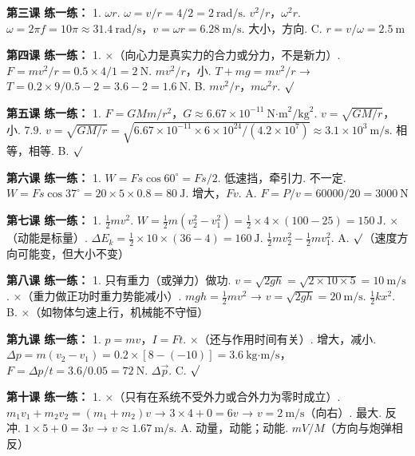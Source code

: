 \documentclass[a4paper,12pt]{ctexart}
\begin{document}
\textbf{第三课 练一练：}
1. $\omega r$. $\omega=v/r=4/2=2\ \text{rad/s}$. $v^2/r$，$\omega^2 r$. $\omega=2\pi f=10\pi\approx31.4\ \text{rad/s}$，$v=\omega r=6.28\ \text{m/s}$. 大小，方向. C. $r=v/\omega=2.5\ \text{m}$

\textbf{第四课 练一练：}
1. ×（向心力是真实力的合力或分力，不是新力）. $F=mv^2/r=0.5\times4/1=2\ \text{N}$. $mv^2/r$，小. $T+mg=mv^2/r$ → $T=0.2\times9/0.5-2=3.6-2=1.6\ \text{N}$. B. $mv^2/r$，$m\omega^2 r$. $\surd$

\textbf{第五课 练一练：}
1. $F=GMm/r^2$，$G\approx6.67\times10^{-11}\ \text{N·m}^2/\text{kg}^2$. $v=\sqrt{GM/r}$，小. $7.9$. $v=\sqrt{GM/r}=\sqrt{6.67\times10^{-11}\times6\times10^{24}/(4.2\times10^7)}\approx3.1\times10^3\ \text{m/s}$. 相等，相等. B. $\surd$

\textbf{第六课 练一练：}
1. $W=Fs\cos60^\circ=Fs/2$. 低速挡，牵引力. 不一定. $W=Fs\cos37^\circ=20\times5\times0.8=80\ \text{J}$. 增大，$Fv$. A. $F=P/v=60000/20=3000\ \text{N}$

\textbf{第七课 练一练：}
1. $\frac{1}{2}mv^2$. $W=\frac{1}{2}m(v_2^2-v_1^2)=\frac{1}{2}\times4\times(100-25)=150\ \text{J}$. ×（动能是标量）. $\Delta E_k=\frac{1}{2}\times10\times(36-4)=160\ \text{J}$. $\frac{1}{2}mv_2^2-\frac{1}{2}mv_1^2$. A. $\surd$（速度方向可能变，但大小不变）

\textbf{第八课 练一练：}
1. 只有重力（或弹力）做功. $v=\sqrt{2gh}=\sqrt{2\times10\times5}=10\ \text{m/s}$. ×（重力做正功时重力势能减小）. $mgh=\frac{1}{2}mv^2$ → $v=\sqrt{2gh}=20\ \text{m/s}$. $\frac{1}{2}kx^2$. B. ×（如物体匀速上行，机械能不守恒）

\textbf{第九课 练一练：}
1. $p=mv$，$I=Ft$. ×（还与作用时间有关）. 增大，减小. $\Delta p=m(v_2-v_1)=0.2\times[8-(-10)]=3.6\ \text{kg·m/s}$，$F=\Delta p/t=3.6/0.05=72\ \text{N}$. $\Delta\vec{p}$. C. $\surd$

\textbf{第十课 练一练：}
1. ×（只有在系统不受外力或合外力为零时成立）. $m_1v_1+m_2v_2=(m_1+m_2)v$ → $3\times4+0=6v$ → $v=2\ \text{m/s}$（向右）. 最大. 反冲. $1\times5+0=3v$ → $v\approx1.67\ \text{m/s}$. A. 动量，动能；动能. $mV/M$（方向与炮弹相反）
\end{document}

